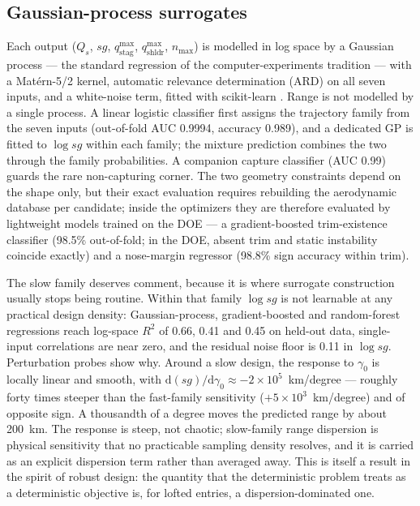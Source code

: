 \subsection{Gaussian-process surrogates}
\label{sec:gp}

Each output ($Q_s$, $sg$, $q_{\mathrm{stag}}^{\max}$,
$q_{\mathrm{shldr}}^{\max}$, $n_{\max}$) is modelled in log space by a
Gaussian process --- the standard regression of the computer-experiments
tradition \cite{sacks1989} --- with a Mat\'ern-5/2 kernel, automatic
relevance determination (ARD) on all seven inputs, and a white-noise term,
fitted with scikit-learn \cite{rasmussen2006gp,pedregosa2011sklearn}. Range is not
modelled by a single process. A linear logistic classifier first assigns the
trajectory family from the seven inputs (out-of-fold AUC 0.9994, accuracy
0.989), and a dedicated GP is fitted to $\log sg$ within each family; the
mixture prediction combines the two through the family probabilities. A
companion capture classifier (AUC 0.99) guards the rare non-capturing
corner. The two geometry constraints depend on the shape only, but their
exact evaluation requires rebuilding the aerodynamic database per candidate;
inside the optimizers they are therefore evaluated by lightweight models
trained on the DOE --- a gradient-boosted trim-existence classifier (98.5\%
out-of-fold; in the DOE, absent trim and static instability coincide
exactly) and a nose-margin regressor (98.8\% sign accuracy within trim).

The slow family deserves comment, because it is where surrogate
construction usually stops being routine. Within that family $\log sg$ is
not learnable at any practical design density: Gaussian-process,
gradient-boosted and random-forest regressions reach log-space $R^2$ of
0.66, 0.41 and 0.45 on held-out data, single-input correlations are near
zero, and the residual noise floor is 0.11 in $\log sg$. Perturbation probes
show why. Around a slow design, the response to $\gamma_0$ is locally linear
and smooth, with $\mathrm{d}(sg)/\mathrm{d}\gamma_0\approx
-2\times10^{5}$~km/degree --- roughly forty times steeper than the
fast-family sensitivity ($+5\times10^{3}$~km/degree) and of opposite sign.
A thousandth of a degree moves the predicted range by about 200~km. The
response is steep, not chaotic; slow-family range dispersion is physical
sensitivity that no practicable sampling density resolves, and it is carried
as an explicit dispersion term rather than averaged away. This is itself a
result in the spirit of robust design: the quantity that the deterministic
problem treats as a deterministic objective is, for lofted entries, a
dispersion-dominated one.

